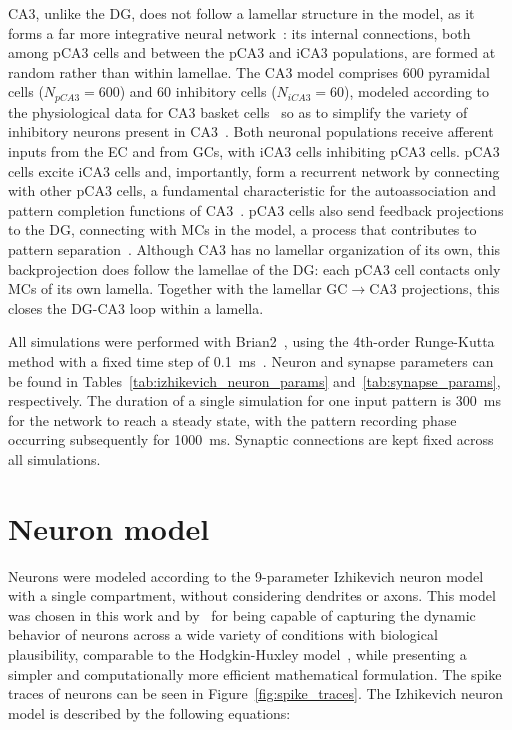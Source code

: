 CA3, unlike the DG, does not follow a lamellar structure in the model, as it forms a far more integrative neural
network~\parencite{pakHippocampal2022, watsonHuman2025}: its internal connections, both among pCA3 cells and between the pCA3 and
iCA3 populations, are formed at random rather than within lamellae. The CA3 model comprises 600 pyramidal cells ($N_{pCA3} = 600$) and 60
inhibitory cells ($N_{iCA3} = 60$), modeled according to the physiological data for CA3 basket cells~\parencite{wheelerHippocampomeorg2023}
so as to simplify the variety of inhibitory neurons present in CA3~\parencite{kopsickFormation2024}. Both neuronal populations
receive afferent inputs from the EC and from GCs, with iCA3 cells inhibiting pCA3 cells\@. pCA3 cells excite iCA3 cells and,
importantly, form a recurrent network by connecting with other pCA3 cells, a fundamental characteristic for the autoassociation
and pattern completion functions of CA3~\parencite{kopsickFormation2024, rollsMechanisms2013}\@. pCA3 cells also send feedback
projections to the DG, connecting with MCs in the model, a process that contributes to pattern
separation~\parencite{myersPattern2011}. Although CA3 has no lamellar organization of its own, this backprojection does follow the
lamellae of the DG\@: each pCA3 cell contacts only MCs of its own lamella. Together with the lamellar GC$\to$CA3 projections, this
closes the DG-CA3 loop within a lamella.

All simulations were performed with Brian2~\parencite{stimbergBrian2019a}, using the 4th-order Runge-Kutta method with a fixed time
step of \SI{0.1}{\milli\second}~\parencite{butcherHistory1996}. Neuron and synapse parameters can be found in
Tables~\ref{tab:izhikevich_neuron_params} and~\ref{tab:synapse_params}, respectively. The duration of a single simulation for
one input pattern is \SI{300}{\milli\second} for the network to reach a steady state, with the pattern recording phase
occurring subsequently for \SI{1000}{\milli\second}. Synaptic connections are kept fixed across all simulations.



\section{Neuron model}

Neurons were modeled according to the 9-parameter Izhikevich neuron model~\parencite[chapter~8]{izhikevichDynamical2006} with a single
compartment, without considering dendrites or axons. This model was chosen in this work and by~\textcite{wheelerHippocampomeorg2023}
for being capable of capturing the dynamic behavior of neurons across a wide variety of conditions with biological plausibility,
comparable to the Hodgkin-Huxley model~\parencite{hodgkinQuantitative1952}, while presenting a simpler and computationally more
efficient mathematical formulation. The spike traces of neurons can be seen in Figure~\ref{fig:spike_traces}. The Izhikevich
neuron model is described by the following equations:


